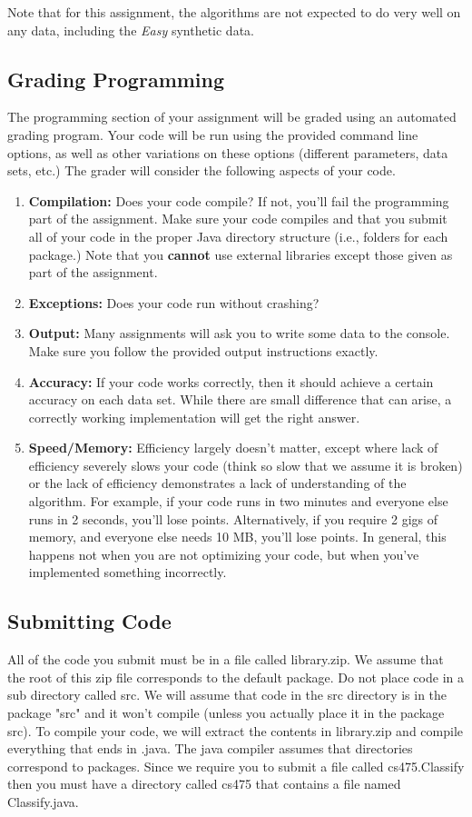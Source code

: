 \documentclass[11pt]{article}
\begin{document}
Note that for this assignment, the algorithms are not expected to do very well on any data, including the \emph{Easy} synthetic data.

\subsection{Grading Programming}
The programming section of your assignment will be graded using an automated grading program. Your code will be run using
the provided command line options, as well as other variations on these options (different parameters, data sets, etc.) The grader will consider the following aspects of your code.
\begin{enumerate}
\item {\bf Compilation:} Does your code compile? If not, you'll fail the programming part of the assignment. Make sure your code compiles and that you submit all of your code in the proper Java directory structure (i.e., folders for each package.) Note that you {\bf cannot} use external libraries except those given as part of the assignment.
\item {\bf Exceptions:} Does your code run without crashing?
\item {\bf Output:} Many assignments will ask you to write some data to the console. Make sure you follow the provided output instructions exactly.
\item {\bf Accuracy:} If your code works correctly, then it should achieve a certain accuracy on each data set. While there are small difference that can arise, a correctly working implementation will get the right answer.
\item {\bf Speed/Memory:} Efficiency largely doesn't matter, except where lack of efficiency severely slows your code (think so slow that we assume it is broken) or the lack of efficiency demonstrates a lack of understanding of the algorithm.  For example, if your code runs in two minutes and everyone else runs in 2 seconds, you'll lose points. Alternatively, if you require 2 gigs of memory, and everyone else needs 10 MB, you'll lose points. In general, this happens not when you are not optimizing your code, but when you've implemented something incorrectly.

\end{enumerate}

\subsection{Submitting Code}
All of the code you submit must be in a file called library.zip. We assume that the root of this zip file corresponds to the default package. Do not place code in a sub directory called src. We will assume that code in the src directory is in the package "src" and it won't compile (unless you actually place it in the package src). To compile your code, we will extract the contents in library.zip and compile everything that ends in .java. The java compiler assumes that directories correspond to packages. Since we require you to submit a file called cs475.Classify then you must have a directory called cs475 that contains a file named Classify.java.
\end{document}
